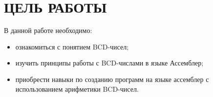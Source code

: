 \section{ЦЕЛЬ РАБОТЫ}

В данной работе необходимо:

\begin{itemize}

  \item ознакомиться с понятием BCD-чисел;

  \item изучить принципы работы с BCD-числами в языке Ассемблер;

  \item приобрести навыки по созданию программ на языке ассемблер с использованием
  арифметики BCD-чисел.

\end{itemize}

\newpage
